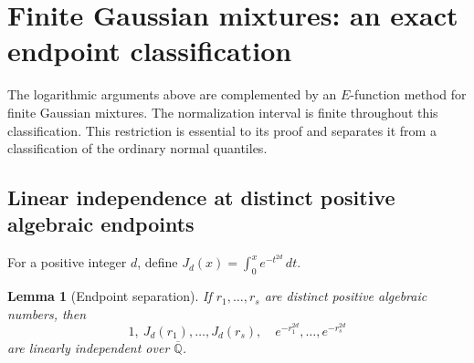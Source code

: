 \documentclass[11pt,a4paper]{article}
\newtheorem{lemma}[theorem]{Lemma}
\theoremstyle{definition}
\theoremstyle{remark}
\numberwithin{equation}{section}
\begin{document}
\section{Finite Gaussian mixtures: an exact endpoint classification}
\label{beta-stats-sec-gaussian}

The logarithmic arguments above are complemented by an $E$-function
method for finite Gaussian mixtures. The normalization interval is
finite throughout this classification. This restriction is essential
to its proof and separates it from a classification of the ordinary
normal quantiles.

\subsection{Linear independence at distinct positive algebraic endpoints}

For a positive integer $d$, define
$J_d(x)=\int_0^x e^{-t^{2d}}\,dt$.

\begin{lemma}[Endpoint separation]
\label{beta-stats-lem-gaussian-separation}
If $r_1,\ldots,r_s$ are distinct positive algebraic numbers, then
\[
1,\ J_d(r_1),\ldots,J_d(r_s),\quad
e^{-r_1^{2d}},\ldots,e^{-r_s^{2d}}
\]
are linearly independent over $\overline{\mathbb Q}$.
\end{lemma}
\end{document}
